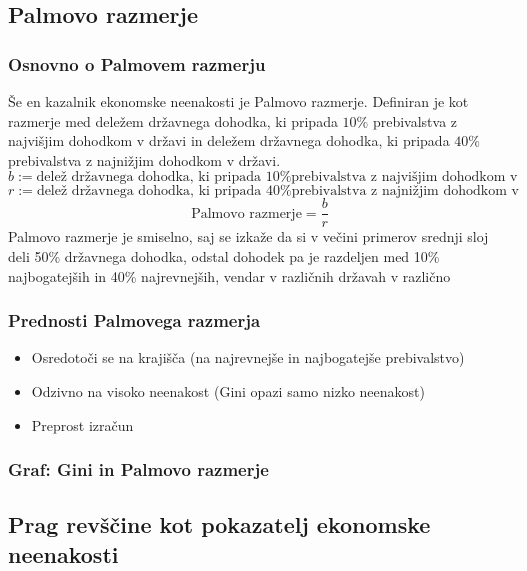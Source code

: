 \documentclass[a4paper,12 pt]{article}
\begin{document}
\subsection{Palmovo razmerje}
\subsubsection{Osnovno o Palmovem razmerju}
Še en kazalnik ekonomske neenakosti je Palmovo razmerje.
Definiran je kot razmerje med deležem državnega dohodka, ki pripada $10\%$ prebivalstva z najvišjim dohodkom v državi in deležem državnega dohodka, ki pripada $40\%$ prebivalstva z najnižjim dohodkom v državi.
$$
b := \textrm{delež državnega dohodka, ki pripada 10\% prebivalstva z najvišjim dohodkom v državi}
$$
$$
r := \textrm{delež državnega dohodka, ki pripada 40\% prebivalstva z najnižjim dohodkom v državi}
$$
$$
\textrm{Palmovo razmerje} = \frac{b}{r}
$$
Palmovo razmerje je smiselno, saj se izkaže da si v večini primerov srednji sloj deli 50\% državnega dohodka, odstal dohodek pa je razdeljen med 10\% najbogatejših in 40\% najrevnejših, vendar v različnih državah v različno

\subsubsection{Prednosti Palmovega razmerja}
\begin{itemize}
\item Osredotoči se na krajišča (na najrevnejše in najbogatejše prebivalstvo)
\item Odzivno na visoko neenakost (Gini opazi samo nizko neenakost)
\item Preprost izračun
\end{itemize}
\subsubsection{Graf: Gini in Palmovo razmerje}



\subsection{Prag revščine kot pokazatelj ekonomske neenakosti}
\end{document}
